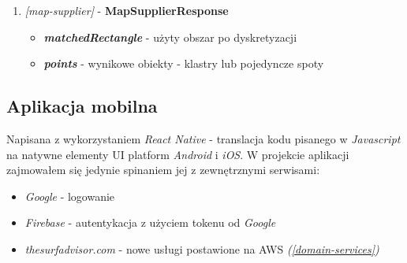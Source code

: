 \begin{enumerate}
    \item
    \large\emph{[map-supplier]} - \textbf{MapSupplierResponse}\normalsize
    \begin{itemize}
        \item
        \textbf{\emph{matchedRectangle}} - użyty obszar po dyskretyzacji

        \item
        \textbf{\emph{points}} - wynikowe obiekty - klastry lub pojedyncze spoty

    \end{itemize} 
    
\end{enumerate}

\pagebreak

\subsection{Aplikacja mobilna}

Napisana z wykorzystaniem \emph{React Native} - translacja kodu pisanego w \emph{Javascript} na natywne elementy UI platform \emph{Android} i \emph{iOS}.
W projekcie aplikacji zajmowałem się jedynie spinaniem jej z zewnętrznymi serwisami:

\begin{itemize}
    \item
    \emph{Google} - logowanie

    \item
    \emph{Firebase} - autentykacja z użyciem tokenu od \emph{Google}

    \item
    \emph{thesurfadvisor.com} - nowe usługi postawione na AWS \emph{(\ref{domain-services})}

\end{itemize} 

